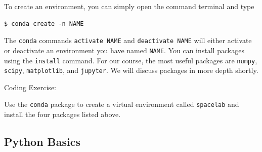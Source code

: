 \documentclass{tufte-book}
\begin{document}
To create an environment, you can simply open the command terminal and type 

\begin{lstlisting}[backgroundcolor=\color{lightgray}]
$ conda create -n NAME
\end{lstlisting}

The \verb|conda| commands \verb|activate NAME| and \verb|deactivate NAME| will either activate or deactivate an environment you have named \verb|NAME|. You can install packages using the \verb|install| command. For our course, the most useful packages are \texttt{numpy}, \texttt{scipy}, \texttt{matplotlib}, and \texttt{jupyter}. We will discuss packages in more depth shortly.

\begin{tcolorbox}[sharp corners=all, colback=white!75!green]

Coding Exercise:

Use the \verb|conda| package to create a virtual environment called \verb|spacelab| and install the four packages listed above.

\end{tcolorbox} 






\subsection{Python Basics}\label{subsec:python-basics}
\end{document}
